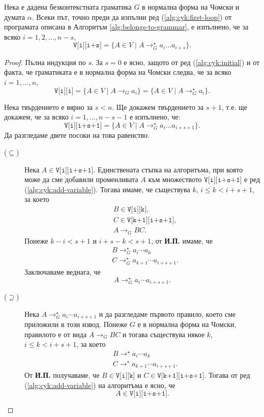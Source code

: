 \begin{lemma}
  Нека е дадена безконтекстната граматика $G$ в нормална форма на Чомски и думата $\alpha$.
  Всеки път, точно преди да изпълни ред (\ref{alg:cyk:first-loop}) от програмата описана в Алгоритъм \ref{alg:belongs-to-grammar},
  е изпълнено, че за всяко $i = 1,2,\dots,n-s$,
  \[\texttt{V[i][i+s]} = \{A \in V \mid A \rightarrow^\star_G a_i\dots a_{i+s}\}.\]
\end{lemma}
\begin{proof}
  Пълна индукция по $s$.
  За $s = 0$ е ясно, защото от ред (\ref{alg:cyk:initial}) и от факта, че граматиката е в нормална форма на Чомски следва, че за всяко $i = 1, \dots, n$, 
  \[\texttt{V[i][i]} = \{A \in V \mid A \to_G a_i\} = \{A \in V \mid A \to^\star_G a_i\}.\]

  Нека твърдението е вярно за $s < n$. Ще докажем твърдението за $s+1$, т.е. ще докажем, че за всяко $i = 1,\dots,n-s-1$
  е изпълнено, че:
  \[\texttt{V[i][i+s+1]} = \{A \in V \mid A \rightarrow^\star_G a_i\dots a_{i+s+1}\}.\]
  Да разгледаме двете посоки на това равенство.
  \begin{description}
  \item[($\subseteq$)]
    Нека $A \in \texttt{V[i][i+s+1]}$.
    Единствената стъпка на алгоритъма, при която може да сме добавили променливата $A$ към множеството $\texttt{V[i][i+s+1]}$ е ред (\ref{alg:cyk:add-variable}).
    Тогава имаме, че съществува $k$, $i \leq k < i+s+1$, за което
    \begin{align*}
      & B \in \texttt{V[i][k]},\\
      & C \in \texttt{V[k+1][i+s+1]},\\
      & A\to_G BC.
    \end{align*}
    Понеже $k-i < s+1$ и $i + s - k < s+1$, от {\bf И.П.} имаме, че
    \begin{align*}
      & B \to^\star_G a_i\cdots a_k\\
      & C \to^\star_G a_{k+1}\cdots a_{i+s+1}.
    \end{align*}
    Заключаваме веднага, че 
    \[A \to^\star_G a_i\cdots a_{i+s+1}.\]
  \item[($\supseteq$)]
    Нека $A \to^\star_G a_i\cdots a_{i+s+1}$ и да разгледаме първото правило, което сме приложили в този извод.
    Понеже $G$ е в нормална форма на Чомски, правилото е от вида $A \to_G BC$ и тогава съществува някое $k$, $i \leq k < i+s+1$, за което
    \begin{align*}
      & B \to^\star a_i\cdots a_{k}\\
      & C \to^\star a_{k+1}\cdots a_{i+s+1}.
    \end{align*}
    От {\bf И.П.} получаваме, че $B \in \texttt{V[i][k]}$ и $C \in \texttt{V[k+1][i+s+1]}$.
    Тогава от ред (\ref{alg:cyk:add-variable}) на алгоритъма е ясно, че 
    \[A \in \texttt{V[i][i+s+1]}.\]
  \end{description}
\end{proof}

